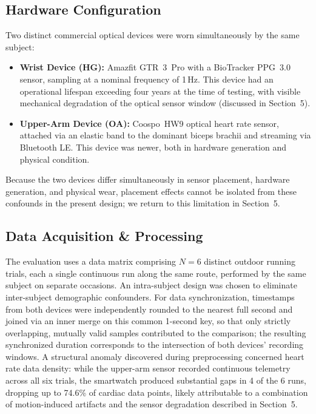 \documentclass{acmsiggraph}
\begin{document}
\subsection{Hardware Configuration}

Two distinct commercial optical devices were worn simultaneously by the
same subject:
\begin{itemize}
  \item \textbf{Wrist Device (HG):} Amazfit GTR~3~Pro with a BioTracker
  PPG~3.0 sensor, sampling at a nominal frequency of 1\,Hz. This device
  had an operational lifespan exceeding four years at the time of
  testing, with visible mechanical degradation of the optical sensor
  window (discussed in Section~5).
  \item \textbf{Upper-Arm Device (OA):} Coospo~HW9 optical heart rate
  sensor, attached via an elastic band to the dominant biceps brachii and
  streaming via Bluetooth LE. This device was newer, both in hardware
  generation and physical condition.
\end{itemize}
Because the two devices differ simultaneously in sensor placement,
hardware generation, and physical wear, placement effects cannot be
isolated from these confounds in the present design; we return to this
limitation in Section~5.

\subsection{Data Acquisition \& Processing}

The evaluation uses a data matrix comprising $N=6$ distinct outdoor
running trials, each a single continuous run along the same route,
performed by the same subject on separate occasions. An intra-subject
design was chosen to eliminate inter-subject demographic confounders.
For data synchronization, timestamps from both devices were independently
rounded to the nearest full second and joined via an inner merge on this
common 1-second key, so that only strictly overlapping, mutually valid
samples contributed to the comparison; the resulting synchronized
duration corresponds to the intersection of both devices' recording
windows. A structural anomaly discovered during preprocessing concerned
heart rate data density: while the upper-arm sensor recorded continuous
telemetry across all six trials, the smartwatch produced substantial
gaps in 4 of the 6 runs, dropping up to 74.6\% of cardiac data points,
likely attributable to a combination of motion-induced artifacts and the
sensor degradation described in Section~5.
\end{document}

